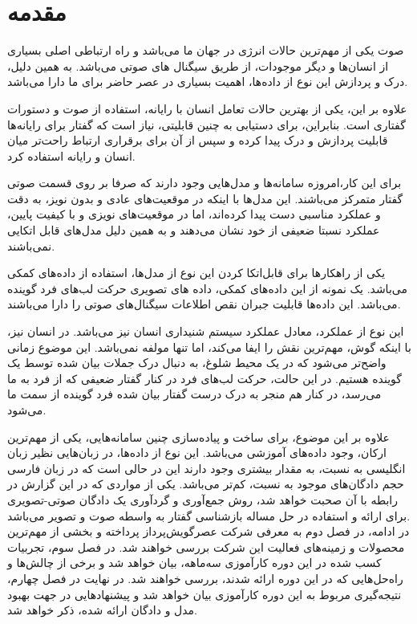 \chapter{مقدمه}
صوت یکی از مهم‌ترین حالات انرژی در جهان ما می‌باشد و راه ارتباطی اصلی بسیاری از انسان‌ها و دیگر موجودات،‌ از طریق سیگنال های صوتی می‌باشد. به همین دلیل، درک و پردازش این نوع از داده‌ها، اهمیت بسیاری در عصر حاضر برای ما دارا می‌باشد. 

علاوه بر این، یکی از بهترین حالات تعامل انسان با رایانه، استفاده از صوت و دستورات گفتاری است. بنابراین، برای دستیابی به چنین قابلیتی، نیاز است که گفتار برای رایانه‌ها قابلیت پردازش و درک پیدا کرده و سپس از آن برای برقراری ارتباط راحت‌تر میان انسان و رایانه استفاده کرد.

برای این کار،‌امروزه سامانه‌ها و مدل‌هایی وجود دارند که صرفا بر روی قسمت صوتی گفتار متمرکز می‌باشند. این مدل‌ها با اینکه در موقعیت‌های عادی و بدون نویز، به دقت و عملکرد مناسبی دست پیدا کرده‌اند، اما در موقعیت‌های نویزی و با کیفیت پایین، عملکرد نسبتا ضعیفی از خود نشان می‌دهند و به همین دلیل مدل‌های قابل اتکایی نمی‌باشند.

یکی از راهکار‌ها برای قابل‌اتکا کردن این نوع از مدل‌ها، استفاده از داده‌های کمکی می‌باشد. یک نمونه از این داده‌های کمکی، داده های تصویری حرکت لب‌های فرد گوینده می‌باشد. این داده‌ها قابلیت جبران نقص اطلاعات سیگنال‌های صوتی را دارا می‌باشند. 

این نوع از عملکرد، معادل عملکرد سیستم شنیداری انسان نیز می‌باشد. در انسان نیز، با اینکه گوش، مهم‌ترین نقش را ایفا می‌کند، اما تنها مولفه نمی‌باشد. این موضوع زمانی واضح‌تر می‌شود که در یک محیط شلوغ، به دنبال درک جملات بیان شده توسط یک گوینده هستیم. در این حالت، حرکت لب‌های فرد در کنار گفتار ضعیفی که از فرد به ما می‌رسد، در کنار هم منجر به درک درست گفتار بیان شده فرد گوینده از سمت ما می‌شود.

علاوه بر این موضوع، برای ساخت و پیاده‌سازی چنین سامانه‌هایی، یکی از مهم‌ترین ارکان، وجود داده‌های آموزشی می‌باشد. این نوع از داده‌ها، در زبان‌هایی نظیر زبان انگلیسی به نسبت، به مقدار بیشتری وجود دارند این در حالی است که در زبان فارسی حجم دادگان‌های موجود به نسبت، کم‌تر می‌باشد. یکی از مواردی که در این گزارش در رابطه با آن صحبت خواهد شد، روش جمع‌آوری و گردآوری یک دادگان صوتی-تصویری برای ارائه و استفاده در حل مساله بازشناسی گفتار به واسطه صوت و تصویر می‌باشد.
\\

در ادامه، در فصل دوم به معرفی شرکت عصرگویش‌پرداز پرداخته و بخشی از مهم‌ترین محصولات و زمینه‌های فعالیت این شرکت بررسی خواهند شد. در فصل سوم، تجربیات کسب شده در این دوره کارآموزی سه‌ماهه، بیان خواهد شد و برخی از چالش‌ها و راه‌حل‌هایی که در این دوره ارائه شدند، بررسی خواهند شد. در نهایت در فصل چهارم، نتیجه‌گیری مربوط به این دوره کارآموزی بیان خواهد شد و پیشنهاد‌هایی در جهت بهبود مدل و دادگان ارائه شده، ذکر خواهد شد.
